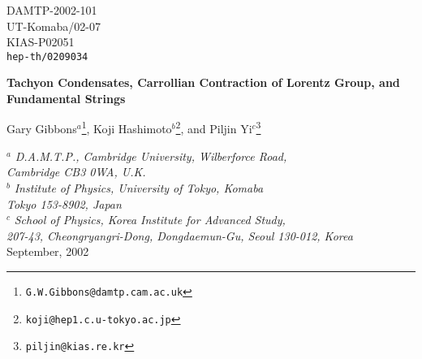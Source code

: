 \documentclass[a4paper,12pt]{article}
\begin{document}
\begin{titlepage}
\vfill
\begin{flushright}
{\normalsize DAMTP-2002-101}\\
{\normalsize UT-Komaba/02-07}\\
{\normalsize KIAS-P02051}\\
{\normalsize\tt hep-th/0209034}

\end{flushright}

\vfill
\begin{center}
{\Large\bf
Tachyon Condensates, Carrollian Contraction of Lorentz Group,
and Fundamental Strings
}

\vskip 0.3in

{
\large
Gary Gibbons$^a$\footnote{\tt G.W.Gibbons@damtp.cam.ac.uk},  
Koji Hashimoto$^b$\footnote{\tt koji@hep1.c.u-tokyo.ac.jp},
and 
Piljin  Yi$^c$\footnote{{\tt piljin@kias.re.kr}}
}

\vskip 0.15in


${}^a$ {\it D.A.M.T.P., Cambridge University, Wilberforce Road,} \\
{\it Cambridge CB3 0WA,  U.K.}\\[3pt]
${}^b$ {\it Institute of Physics, University of Tokyo, Komaba}\\
{\it Tokyo 153-8902, Japan}\\[3pt]
${}^c$ {\it School of Physics, Korea Institute for Advanced Study,} \\
{\it 207-43, Cheongryangri-Dong, Dongdaemun-Gu, Seoul 130-012, Korea}
\\[0.3in]

{\normalsize September, 2002}    


\end{center}


\vfill

\begin{abstract}
\normalsize\noindent 
We study the  rolling tachyon condensate in the presence of a gauge
 field. The generic vacuum admits both a rolling tachyon, $\dot T$, and
 a uniform electric  field, ${\vec E} $, which together affect the
 effective metric governing the  fluctuations of open string modes. If
 one suppresses the gauge field altogether, the light-cone collapses
 completely. This is the Carrollian limit, with vanishing speed of light
 and no possible propagation of signals. In the presence of a gauge
 field,
 however, the lightcone is squeezed to the shape of a fan,  allowing
 propagation of signals along the direction of $\pm \vec E$ at speed
$|\vec E| \le 1$. This shows that there are perturbative degrees of freedom
 propagating along electric flux lines. Such causal behavior appears to
 be a very general feature of tachyon effective Lagrangian with runway
 potentials. We speculate on how this may be connected to appearance
 of fundamental strings.
\end{abstract}


\vfill

\end{titlepage}
\setcounter{footnote}{0}
\end{document}
